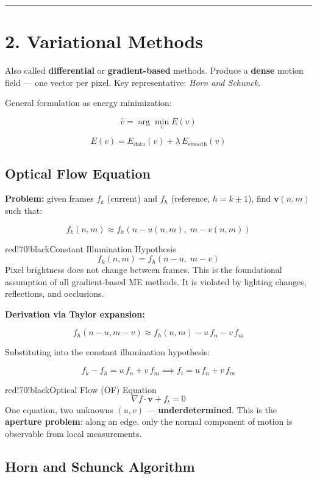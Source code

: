 \bigskip\hrule\bigskip

\section{2. Variational Methods}

Also called \textbf{differential} or \textbf{gradient-based} methods. Produce a \textbf{dense} motion field — one vector per pixel. Key representative: \textit{Horn and Schunck}.

General formulation as energy minimization:

\[
\hat{v} = \arg\min_v E(v)
\]

\[
E(v) = E_{\text{data}}(v) + \lambda\, E_{\text{smooth}}(v)
\]
\subsection{Optical Flow Equation}

\textbf{Problem:} given frames $f_k$ (current) and $f_h$ (reference, $h = k \pm 1$), find $\mathbf{v}(n,m)$ such that:

\[
f_k(n,m) \approx f_h(n - u(n,m),\; m - v(n,m))
\]

\begin{calloutbox}{red!70!black}{Constant Illumination Hypothesis}
\[
f_k(n,m) = f_h(n - u,\; m - v)
\]
Pixel brightness does not change between frames. This is the foundational assumption of all gradient-based ME methods. It is violated by lighting changes, reflections, and occlusions.
\end{calloutbox}

\textbf{Derivation via Taylor expansion:}

\[
f_h(n-u, m-v) \approx f_h(n,m) - u\,f_n - v\,f_m
\]

Substituting into the constant illumination hypothesis:

\[
f_k - f_h = u\,f_n + v\,f_m \implies f_t = u\,f_n + v\,f_m
\]

\begin{calloutbox}{red!70!black}{Optical Flow (OF) Equation}
\[
\nabla f \cdot \mathbf{v} + f_t = 0
\]
One equation, two unknowns $(u, v)$ — \textbf{underdetermined}. This is the \textbf{aperture problem}: along an edge, only the normal component of motion is observable from local measurements.
\end{calloutbox}

\subsection{Horn and Schunck Algorithm}

